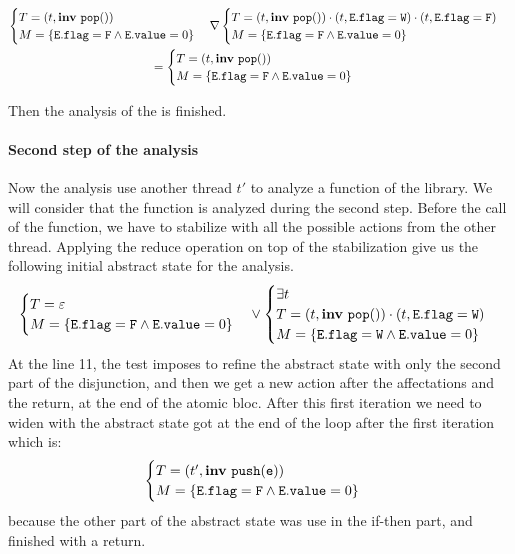 \begin{scriptsize}
\begin{multline*}
\begin{cases}
	T = (t, \mathbf{inv}\ \mathtt{pop}())\\
	M = \{\mathtt{E.flag} = \mathtt{F} \wedge \mathtt{E.value} = 0\}
\end{cases}
\nabla
\begin{cases}
	T =  (t, \mathbf{inv}\ \mathtt{pop}())\cdot(t, \mathtt{E.flag=W})\cdot (t, \mathtt{E.flag=F})\\
	M = \{\mathtt{E.flag} = \mathtt{F} \wedge \mathtt{E.value} = 0\}
\end{cases} \\ =
\begin{cases}
	T = (t, \mathbf{inv}\ \mathtt{pop}())\\
	M = \{\mathtt{E.flag} = \mathtt{F} \wedge \mathtt{E.value} = 0\}
\end{cases}
\end{multline*} 
\end{scriptsize} Then the analysis of the  is finished. 

\paragraph{Second step of the analysis}

Now the analysis use another thread $t'$ to analyze a function of the library. We will consider that the function  is analyzed during the second step. Before the call of the  function, we have to stabilize with all the possible actions from the other thread. Applying the reduce operation on top of the stabilization give us the following initial abstract state for the  analysis.
\[\begin{cases}
	T = \varepsilon\\
	M = \{\mathtt{E.flag} = \mathtt{F} \wedge \mathtt{E.value} = 0\}
\end{cases} \vee
\begin{cases}
	\exists t \\
	T = (t, \mathbf{inv}\ \mathtt{pop}()) \cdot (t, \mathtt{E.flag} = \mathtt{W})\\
	M = \{\mathtt{E.flag} = \mathtt{W} \wedge \mathtt{E.value} = 0\}
\end{cases}
\]
At the line 11, the test imposes to refine the abstract state with only the second part of the disjunction, and then we get a new action after the affectations and the return, at the end of the atomic bloc. 
After this first iteration we need to widen with the abstract state got at the end of the loop after the first iteration which is: 
\[\begin{cases}
	T = (t', \mathbf{inv}\ \mathtt{push}(\mathtt{e}))\\
	M = \{\mathtt{E.flag} = \mathtt{F} \wedge \mathtt{E.value} = 0\}
\end{cases}
\]
because the other part of the abstract state was use in the if-then part, and finished with a return.

